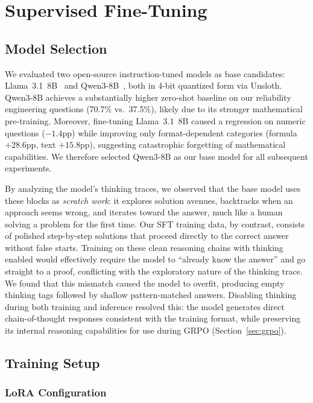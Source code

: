\section{Supervised Fine-Tuning}
\label{sec:sft}

\subsection{Model Selection}
\label{sec:sft:model}

We evaluated two open-source instruction-tuned models as base candidates: Llama~3.1~8B~\cite{grattafiori2024llama3} and Qwen3-8B~\cite{qwen2025qwen3}, both in 4-bit quantized form via Unsloth. Qwen3-8B achieves a substantially higher zero-shot baseline on our reliability engineering questions (70.7\% vs.\ 37.5\%), likely due to its stronger mathematical pre-training. Moreover, fine-tuning Llama~3.1~8B caused a regression on numeric questions ($-1.4$pp) while improving only format-dependent categories (formula $+28.6$pp, text $+15.8$pp), suggesting catastrophic forgetting of mathematical capabilities. We therefore selected Qwen3-8B as our base model for all subsequent experiments.

By analyzing the model's thinking traces, we observed that the base model uses these blocks as \emph{scratch work}: it explores solution avenues, backtracks when an approach seems wrong, and iterates toward the answer, much like a human solving a problem for the first time. Our SFT training data, by contrast, consists of polished step-by-step solutions that proceed directly to the correct answer without false starts. Training on these clean reasoning chains with thinking enabled would effectively require the model to ``already know the answer'' and go straight to a proof, conflicting with the exploratory nature of the thinking trace. We found that this mismatch caused the model to overfit, producing empty thinking tags followed by shallow pattern-matched answers. Disabling thinking during both training and inference resolved this: the model generates direct chain-of-thought responses consistent with the training format, while preserving its internal reasoning capabilities for use during GRPO (Section~\ref{sec:grpo}).

\subsection{Training Setup}
\label{sec:sft:setup}

\subsubsection{LoRA Configuration}

